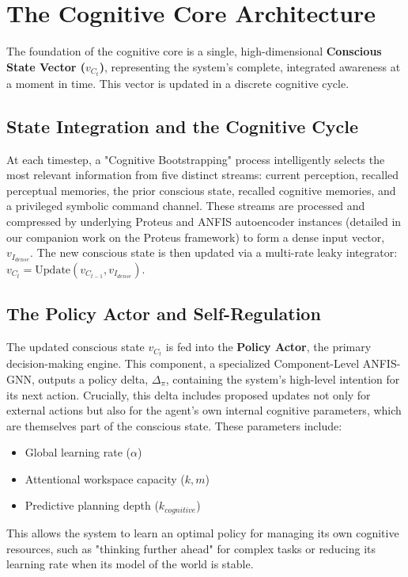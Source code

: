 \documentclass{article}
\begin{document}
\section{The Cognitive Core Architecture}

The foundation of the cognitive core is a single, high-dimensional \textbf{Conscious State Vector ($v_C_t$)}, representing the system's complete, integrated awareness at a moment in time. This vector is updated in a discrete cognitive cycle.

\subsection{State Integration and the Cognitive Cycle}
At each timestep, a "Cognitive Bootstrapping" process intelligently selects the most relevant information from five distinct streams: current perception, recalled perceptual memories, the prior conscious state, recalled cognitive memories, and a privileged symbolic command channel. These streams are processed and compressed by underlying Proteus and ANFIS autoencoder instances (detailed in our companion work on the Proteus framework) to form a dense input vector, $v_{I_{dense}}$. The new conscious state is then updated via a multi-rate leaky integrator: $v_C_t = \text{Update}(v_C_{t-1}, v_{I_{dense}})$.

\subsection{The Policy Actor and Self-Regulation}
The updated conscious state $v_C_t$ is fed into the \textbf{Policy Actor}, the primary decision-making engine. This component, a specialized Component-Level ANFIS-GNN, outputs a policy delta, $\Delta_\pi$, containing the system's high-level intention for its next action. Crucially, this delta includes proposed updates not only for external actions but also for the agent's own internal cognitive parameters, which are themselves part of the conscious state. These parameters include:
\begin{itemize}
    \item Global learning rate ($\alpha$)
    \item Attentional workspace capacity ($k, m$)
    \item Predictive planning depth ($k_{cognitive}$)
\end{itemize}
This allows the system to learn an optimal policy for managing its own cognitive resources, such as "thinking further ahead" for complex tasks or reducing its learning rate when its model of the world is stable.
\end{document}
